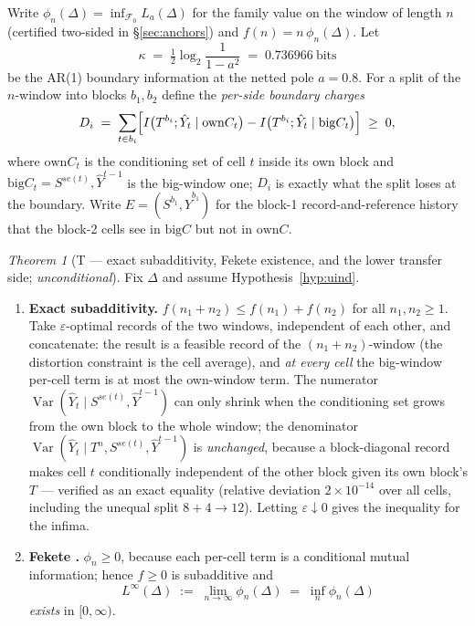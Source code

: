\documentclass[11pt]{article}
\theoremstyle{definition}
\theoremstyle{remark}
\newtheorem{namedthm}{Theorem}
\begin{document}
Write $\phi_n(\Delta)=\inf_{\mathcal F_0}L_a(\Delta)$ for the family
value on the window of length $n$ (certified two-sided in
\S\ref{sec:anchors}) and $f(n)=n\,\phi_n(\Delta)$. Let
\[
\kappa\;=\;\tfrac12\log_2\frac{1}{1-a^2}\;=\;0.736966\ \text{bits}
\]
be the AR(1) boundary information at the netted pole $a=0.8$. For a
split of the $n$-window into blocks $b_1,b_2$ define the \emph{per-side
boundary charges}
\[
D_i\;=\;\sum_{t\in b_i}\Bigl[
I\bigl(T^{b_i};\hat Y_t\mid \mathrm{own}C_t\bigr)
-I\bigl(T^{b_i};\hat Y_t\mid \mathrm{big}C_t\bigr)\Bigr]\;\ge\;0,
\]
where $\mathrm{own}C_t$ is the conditioning set of cell $t$ inside its
own block and $\mathrm{big}C_t=S^{se(t)},\hat Y^{t-1}$ is the
big-window one; $D_i$ is exactly what the split loses at the boundary.
Write $E=(S^{b_1},\hat Y^{b_1})$ for the block-1 record-and-reference
history that the block-2 cells see in $\mathrm{big}C$ but not in
$\mathrm{own}C$.

\begin{namedthm}[T --- exact subadditivity, Fekete existence, and the
lower transfer side; \emph{unconditional}]
\label{thm:transfer}
Fix $\Delta$ and assume Hypothesis~\ref{hyp:uind}.
\begin{enumerate}
\item[(i)] \textbf{Exact subadditivity.}
$f(n_1+n_2)\le f(n_1)+f(n_2)$ for all $n_1,n_2\ge1$. Take
$\varepsilon$-optimal records of the two windows, independent of each
other, and concatenate: the result is a feasible record of the
$(n_1+n_2)$-window (the distortion constraint is the cell average),
and \emph{at every cell} the big-window per-cell term is at most the
own-window term. The numerator
$\operatorname{Var}(\hat Y_t\mid S^{se(t)},\hat Y^{t-1})$ can only
shrink when the conditioning set grows from the own block to the whole
window; the denominator
$\operatorname{Var}(\hat Y_t\mid T^{n},S^{se(t)},\hat Y^{t-1})$ is
\emph{unchanged}, because a block-diagonal record makes cell $t$
conditionally independent of the other block given its own block's
$T$ --- verified as an exact equality (relative deviation
$2\times10^{-14}$ over all cells, including the unequal split
$8+4\to12$). Letting $\varepsilon\downarrow0$ gives the inequality
for the infima.
\item[(ii)] \textbf{Fekete \cite{bib:fekete23}.} $\phi_n\ge0$, because each per-cell term
is a conditional mutual information; hence $f\ge0$ is subadditive and
\[
L^\infty(\Delta)\;:=\;\lim_{n\to\infty}\phi_n(\Delta)
\;=\;\inf_n\phi_n(\Delta)
\]
\emph{exists} in $[0,\infty)$.
\end{enumerate}
\end{namedthm}
\end{document}
